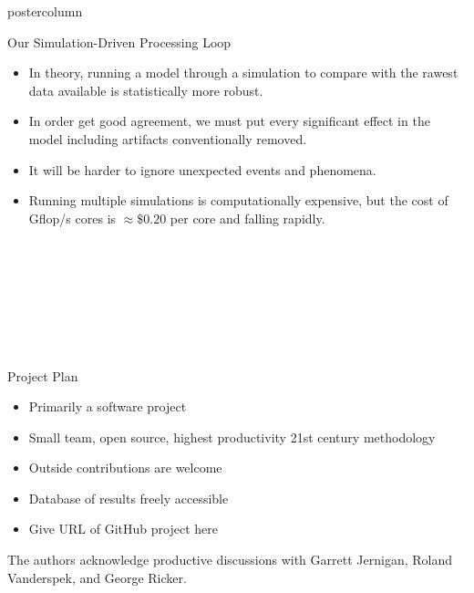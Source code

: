 \documentclass[final,hyperref={pdfpagelabels=false}]{beamer}
\begin{document}
\begin{frame}
\begin{columns}
\begin{column}{.49\textwidth}
\begin{beamercolorbox}[center,wd=\textwidth]{postercolumn}
\begin{minipage}[T]{.95\textwidth}
{            \vspace{2cm}
            \begin{block}{Our Simulation-Driven Processing Loop}
            \begin{itemize}
            \item  In theory, running a model through a simulation to compare with the rawest data available is statistically more robust.
            \item In order get good agreement, we must put every significant effect in the model including artifacts conventionally removed.
            \item It will be harder to ignore unexpected events and phenomena.
            \item Running multiple simulations is computationally expensive, but the cost of Gflop/s cores is $\approx\$0.20$ per core and falling rapidly.
            \end{itemize}
              \begin{center}
              \includegraphics[width=0.75\linewidth]{figures/Our_Pipeline.pdf}
              \end{center}
            \end{block}
            \begin{block}{Project Plan}
            \begin{itemize}
		\item Primarily a software project
		\item Small team, open source, highest productivity 21st century methodology
		\item Outside contributions are welcome
		\item Database of results freely accessible
		\item Give URL of GitHub project here
	    \end{itemize}
	    \vspace{1cm}
The authors acknowledge productive discussions with Garrett Jernigan, Roland Vanderspek, and George Ricker.
            \end{block}
          }
        \end{minipage}
      \end{beamercolorbox}
    \end{column}


\end{columns}
\end{frame}
\end{document}
